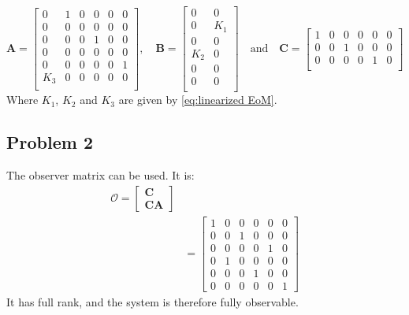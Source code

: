 \begin{equation}
  \label{eq:state_space_A_B_C}
  \bm{A} =
  \begin{bmatrix}
    0 & 1 & 0 & 0 & 0 & 0 \\
    0 & 0 & 0 & 0 & 0 & 0 \\
    0 & 0 & 0 & 1 & 0 & 0 \\
    0 & 0 & 0 & 0 & 0 & 0 \\
    0 & 0 & 0 & 0 & 0 & 1 \\
    K_3 & 0 & 0 & 0 & 0 & 0 \\
  \end{bmatrix}
  , \quad \bm{B} =
  \begin{bmatrix}
    0 & 0 \\
    0 & K_1 \\
    0 & 0 \\
    K_2 & 0 \\
    0 & 0 \\
    0 & 0 \\
  \end{bmatrix}
  \quad \text{and} \quad \bm{C} =
  \begin{bmatrix}
    1 & 0 & 0 & 0 & 0 & 0 \\
    0 & 0 & 1 & 0 & 0 & 0 \\
    0 & 0 & 0 & 0 & 1 & 0 \\
  \end{bmatrix}
\end{equation}
%
Where $K_1$, $K_2$ and $K_3$ are given by \cref{eq:linearized EoM}.
%
\subsection{Problem 2}
The observer matrix can be used. It is:
\begin{align*}
	\bm{\mathcal{O}} =
	\begin{bmatrix}
		\bm{C} \\
		\bm{CA}
	\end{bmatrix} \\
  &=\begin{bmatrix}
    1 & 0 & 0 & 0 & 0 & 0 \\
    0 & 0 & 1 & 0 & 0 & 0 \\
    0 & 0 & 0 & 0 & 1 & 0 \\
    0 & 1 & 0 & 0 & 0 & 0 \\
    0 & 0 & 0 & 1 & 0 & 0 \\
    0 & 0 & 0 & 0 & 0 & 1
	\end{bmatrix}
\end{align*}
It has full rank, and the system is therefore fully observable.

